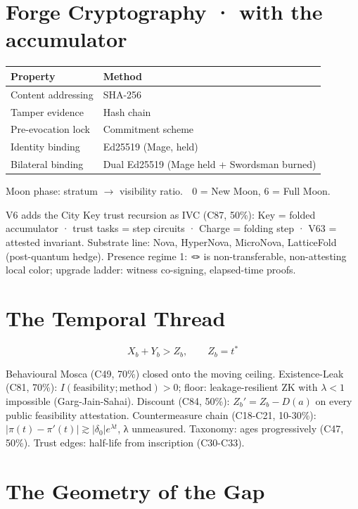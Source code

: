 \documentclass[
  11pt,
]{article}
\newcounter{none} %
\begin{document}
\section{Forge Cryptography · with the
accumulator}\label{forge-cryptography-with-the-accumulator}

{\def\LTcaptype{none} %
\begin{longtable}[]{@{}ll@{}}
\toprule\noalign{}
Property & Method \\
\midrule\noalign{}
\endhead
\bottomrule\noalign{}
\endlastfoot
Content addressing & SHA-256 \\
Tamper evidence & Hash chain \\
Pre-evocation lock & Commitment scheme \\
Identity binding & Ed25519 (Mage, held) \\
Bilateral binding & Dual Ed25519 (Mage held + Swordsman burned) \\
\end{longtable}
}

Moon phase: stratum \(\to\) visibility ratio. \(\;\) 0 = New Moon, 6 =
Full Moon.

V6 adds the City Key trust recursion as IVC (C87, 50\%): Key = folded
accumulator · trust tasks = step circuits · Charge = folding step · V63
= attested invariant. Substrate line: Nova, HyperNova, MicroNova,
LatticeFold (post-quantum hedge). Presence regime 1: 🪢 is
non-transferable, non-attesting local color; upgrade ladder: witness
co-signing, elapsed-time proofs.

\section{The Temporal Thread}\label{the-temporal-thread}

\[X_b + Y_b > Z_b, \qquad Z_b = t^*\]

Behavioural Mosca (C49, 70\%) closed onto the moving ceiling.
Existence-Leak (C81, 70\%):
\(I(\text{feasibility}; \text{method}) > 0\); floor: leakage-resilient
ZK with \(\lambda < 1\) impossible (Garg-Jain-Sahai). Discount (C84,
50\%): \(Z_b' = Z_b - D(a)\) on every public feasibility attestation.
Countermeasure chain (C18-C21, 10-30\%):
\(|\pi(t) - \pi'(t)| \gtrsim |\delta_0| e^{\lambda t}\), λ unmeasured.
Taxonomy: ages progressively (C47, 50\%). Trust edges: half-life from
inscription (C30-C33).

\section{The Geometry of the Gap}\label{the-geometry-of-the-gap}
\end{document}

